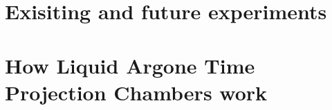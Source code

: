 \section{Exisiting and future experiments} \label{sec:Theory_Exp} %

\section{How Liquid Argone Time Projection Chambers work} %
